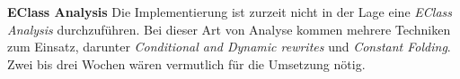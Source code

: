 \textbf{EClass Analysis}
Die Implementierung ist zurzeit nicht in der Lage eine \textit{EClass Analysis} durchzuführen. Bei dieser Art von Analyse kommen mehrere Techniken zum Einsatz, darunter
\textit{Conditional and Dynamic rewrites} und \textit{Constant Folding}. Zwei bis drei Wochen wären vermutlich für die Umsetzung nötig.
